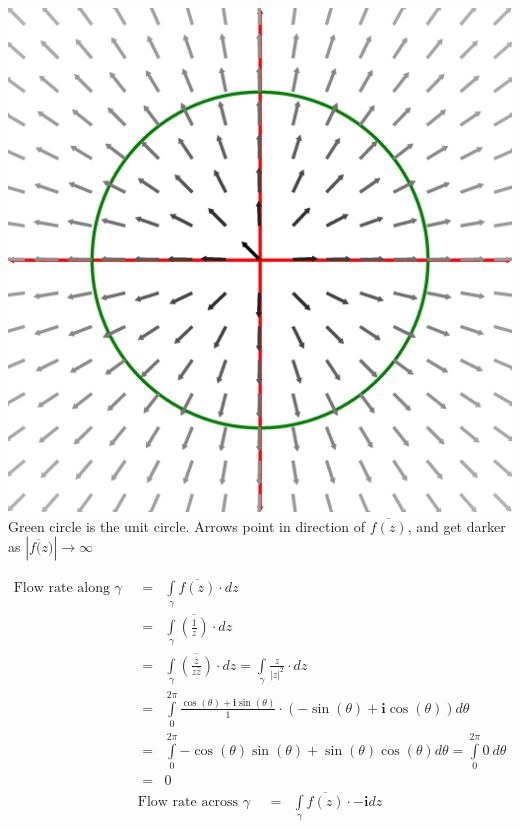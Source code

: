 \documentclass{article}%
\newcommand\abs[1]{\left|#1\right|}
\newcommand\I{\textbf{i}}
\begin{document}
\begin{enumerate}
\begin{enumerate}[label=\alph*)]
\begin{center}
            \includegraphics[scale=0.2]{images/z_inverse_conj.png} \\
            Green circle is the unit circle. Arrows point in direction of $\overline{f(z)}$, and get darker as $\abs{\overline{f(z})}\to\infty$
        \end{center}
        \begin{eqnarray*}
            \text{Flow rate along $\gamma$ } &=& \int\limits_{\gamma}{\overline{f(z)}\cdot dz} \\
                &=& \int\limits_{\gamma}{\overline{\left(\frac{1}{z}\right)}\cdot dz} \\
                &=& \int\limits_{\gamma}{\overline{\left(\frac{\bar{z}}{z\bar{z}}\right)} \cdot dz} = \int\limits_{\gamma}{\frac{z}{\abs{z}^2} \cdot dz} \\
                &=& \int\limits_{0}^{2\pi}{\frac{\cos(\theta)+\I\sin(\theta)}{1} \cdot (-\sin(\theta)+\I\cos(\theta)) d\theta} \\
                &=& \int\limits_{0}^{2\pi}{-\cos(\theta)\sin(\theta)+\sin(\theta)\cos(\theta) d\theta} = \int\limits_{0}^{2\pi}{0~d\theta} \\
                &=& 0
        \end{eqnarray*}
        \begin{eqnarray*}
            \text{Flow rate across $\gamma$ } &=& \int\limits_{\gamma}{\overline{f(z)}\cdot -\I dz} \\

\end{eqnarray*}
\end{enumerate}
\end{enumerate}
\end{document}
